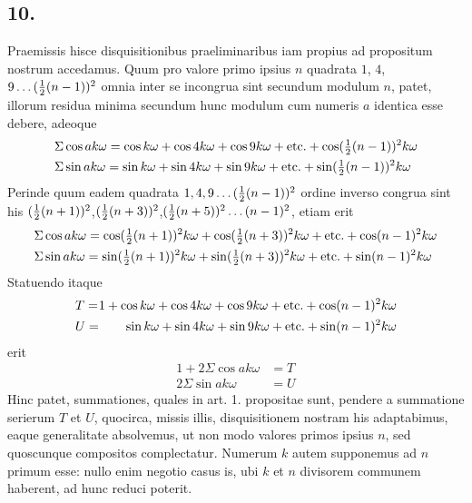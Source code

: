 \documentclass[twoside,12pt]{memoir}
\let\oldfrac\frac
\def\frac#1#2{\mathchoice{\tfrac{#1}{#2}}{\oldfrac{#1}{#2}}{\genfrac{}{}{}{2}{#1}{#2\mathstrut}}{\genfrac{}{}{}{3}{#1}{#2\mathstrut}}}
\begin{document}
\subsection*{10.}
 
Praemissis hisce disquisitionibus praeliminaribus iam propius ad propositum nostrum accedamus. Quum pro valore primo ipsius \(n\) quadrata \(1\), \( 4\), \( 9 \ldots(\frac{1}{2}(n-1))^{2}\) omnia inter se incongrua sint secundum modulum \(n\), patet, illorum residua minima secundum hunc modulum cum numeris \(a\) identica esse debere, adeoque
\[\begin{aligned}
& \Sigma \cos a k \omega=\cos k \omega+\cos 4 k \omega+\cos 9 k \omega+\text{etc.}+\cos (\frac{1}{2}(n-1))^{2} k \omega \\
& \Sigma \sin a k \omega=\sin k \omega+\sin 4 k \omega+\sin 9 k \omega+\text{etc.}+\sin (\frac{1}{2}(n-1))^{2} k \omega
\end{aligned}\]
Perinde quum eadem quadrata \(1,4,9 \ldots(\frac{1}{2}(n-1))^{2}\) ordine inverso congrua sint his \((\frac{1}{2}(n+1))^{2}\),\((\frac{1}{2}(n+3))^{2}\),\((\frac{1}{2}(n+5))^{2} \ldots(n-1)^{2}\), etiam erit\pagebreak%
\[\begin{aligned}
& \Sigma \cos a k \omega=\cos (\frac{1}{2}(n+1))^{2} k \omega+\cos (\frac{1}{2}(n+3))^{2} k \omega+\text{etc.}+\cos (n-1)^{2} k \omega \\
& \Sigma \sin a k \omega=\sin (\frac{1}{2}(n+1))^{2} k \omega+\sin (\frac{1}{2}(n+3))^{2} k \omega+\text{etc.}+\sin (n-1)^{2} k \omega
\end{aligned}\]
Statuendo itaque
\[\begin{alignedat}[t]{2}
&T=&1+\cos k \omega+\cos 4 k \omega+\cos 9 k \omega+\text{etc.}+\cos (n-1)^{2} k \omega \\
& U= &\sin k \omega+\sin 4 k \omega+\sin 9 k \omega+\text{etc.}+\sin (n-1)^{2} k \omega
\end{alignedat}\]
erit
\[\begin{aligned}
1+2 \Sigma \cos a k \omega & =T \\
2 \Sigma \sin a k \omega & =U
\end{aligned}\]
Hinc patet, summationes, quales in art. 1. propositae sunt, pendere a summatione serierum \(T\) et \(U\), quocirca, missis illis, disquisitionem nostram his adaptabimus, eaque generalitate absolvemus, ut non modo valores primos ipsius \(n\), sed quoscunque compositos complectatur. Numerum \(k\) autem supponemus ad \(n\) primum esse: nullo enim negotio casus is, ubi \(k\) et \(n\) divisorem communem haberent, ad hunc reduci poterit.
\end{document}
